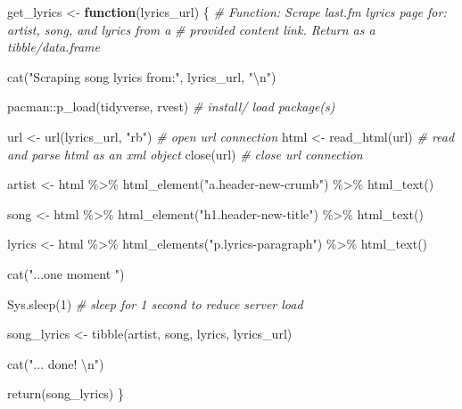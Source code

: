 \documentclass[
]{article}
\newenvironment{Shaded}{\begin{snugshade}}{\end{snugshade}}
\newcommand{\CommentTok}[1]{\textcolor[rgb]{0.56,0.35,0.01}{\textit{#1}}}
\newcommand{\ControlFlowTok}[1]{\textcolor[rgb]{0.13,0.29,0.53}{\textbf{#1}}}
\newcommand{\DecValTok}[1]{\textcolor[rgb]{0.00,0.00,0.81}{#1}}
\newcommand{\FunctionTok}[1]{\textcolor[rgb]{0.00,0.00,0.00}{#1}}
\newcommand{\NormalTok}[1]{#1}
\newcommand{\OtherTok}[1]{\textcolor[rgb]{0.56,0.35,0.01}{#1}}
\newcommand{\SpecialCharTok}[1]{\textcolor[rgb]{0.00,0.00,0.00}{#1}}
\newcommand{\StringTok}[1]{\textcolor[rgb]{0.31,0.60,0.02}{#1}}
\begin{document}
\begin{Shaded}
\begin{Highlighting}[]
\NormalTok{get\_lyrics }\OtherTok{\textless{}{-}} \ControlFlowTok{function}\NormalTok{(lyrics\_url) \{}
    \CommentTok{\# Function: Scrape last.fm lyrics page for: artist, song, and lyrics from a}
    \CommentTok{\# provided content link.  Return as a tibble/data.frame}

    \FunctionTok{cat}\NormalTok{(}\StringTok{"Scraping song lyrics from:"}\NormalTok{, lyrics\_url, }\StringTok{"}\SpecialCharTok{\textbackslash{}n}\StringTok{"}\NormalTok{)}

\NormalTok{    pacman}\SpecialCharTok{::}\FunctionTok{p\_load}\NormalTok{(tidyverse, rvest)  }\CommentTok{\# install/ load package(s)}

\NormalTok{    url }\OtherTok{\textless{}{-}} \FunctionTok{url}\NormalTok{(lyrics\_url, }\StringTok{"rb"}\NormalTok{)  }\CommentTok{\# open url connection }
\NormalTok{    html }\OtherTok{\textless{}{-}} \FunctionTok{read\_html}\NormalTok{(url)  }\CommentTok{\# read and parse html as an xml object}
    \FunctionTok{close}\NormalTok{(url)  }\CommentTok{\# close url connection}

\NormalTok{    artist }\OtherTok{\textless{}{-}}\NormalTok{ html }\SpecialCharTok{\%\textgreater{}\%}
        \FunctionTok{html\_element}\NormalTok{(}\StringTok{"a.header{-}new{-}crumb"}\NormalTok{) }\SpecialCharTok{\%\textgreater{}\%}
        \FunctionTok{html\_text}\NormalTok{()}

\NormalTok{    song }\OtherTok{\textless{}{-}}\NormalTok{ html }\SpecialCharTok{\%\textgreater{}\%}
        \FunctionTok{html\_element}\NormalTok{(}\StringTok{"h1.header{-}new{-}title"}\NormalTok{) }\SpecialCharTok{\%\textgreater{}\%}
        \FunctionTok{html\_text}\NormalTok{()}

\NormalTok{    lyrics }\OtherTok{\textless{}{-}}\NormalTok{ html }\SpecialCharTok{\%\textgreater{}\%}
        \FunctionTok{html\_elements}\NormalTok{(}\StringTok{"p.lyrics{-}paragraph"}\NormalTok{) }\SpecialCharTok{\%\textgreater{}\%}
        \FunctionTok{html\_text}\NormalTok{()}

    \FunctionTok{cat}\NormalTok{(}\StringTok{"...one moment "}\NormalTok{)}

    \FunctionTok{Sys.sleep}\NormalTok{(}\DecValTok{1}\NormalTok{)  }\CommentTok{\# sleep for 1 second to reduce server load}

\NormalTok{    song\_lyrics }\OtherTok{\textless{}{-}} \FunctionTok{tibble}\NormalTok{(artist, song, lyrics, lyrics\_url)}

    \FunctionTok{cat}\NormalTok{(}\StringTok{"... done! }\SpecialCharTok{\textbackslash{}n}\StringTok{"}\NormalTok{)}

    \FunctionTok{return}\NormalTok{(song\_lyrics)}
\NormalTok{\}}
\end{Highlighting}
\end{Shaded}
\end{document}
